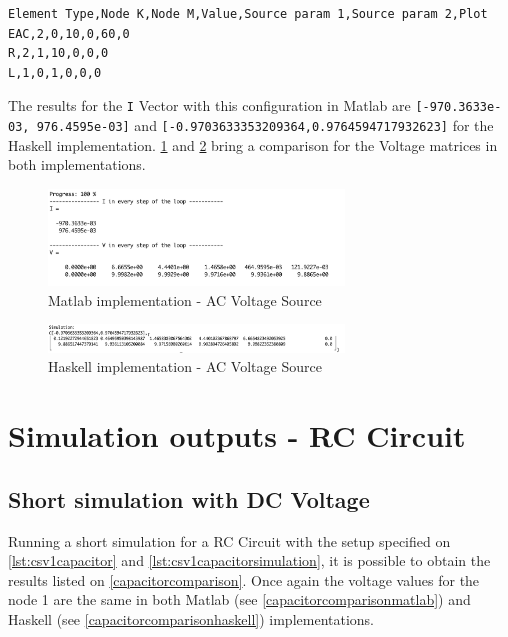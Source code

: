 \begin{lstlisting}[language=bash, label=getinfo, caption={Input data file for components in the Haskell implementation}, captionpos=b, label={lst:csv1reac}]
Element Type,Node K,Node M,Value,Source param 1,Source param 2,Plot
EAC,2,0,10,0,60,0
R,2,1,10,0,0,0
L,1,0,1,0,0,0
\end{lstlisting}

The results for the \lstinline!I! Vector with this configuration in Matlab are \lstinline![-970.3633e-03, 976.4595e-03]! and \lstinline![-0.9703633353209364,0.9764594717932623]! for the Haskell implementation. \ref{eacmatlab} and \ref{eachaskell} bring a comparison for the Voltage matrices in both implementations. 


\begin{figure}[H]
   \centering
   \includegraphics[width=0.7\textwidth]{img/eacmatlab.png}
   \caption{Matlab implementation - AC Voltage Source}
   \label{eacmatlab}
\end{figure}

\begin{figure}[H]
   \centering
   \includegraphics[width=0.7\textwidth]{img/eachaskell.png}
   \caption{Haskell implementation - AC Voltage Source}
   \label{eachaskell}
\end{figure}


\section{Simulation outputs - RC Circuit}

\subsection{Short simulation with DC Voltage}

Running a short simulation for a RC Circuit with the setup specified on \cref{lst:csv1capacitor} and \cref{lst:csv1capacitorsimulation}, it is possible to obtain the results listed on \cref{capacitorcomparison}. Once again the voltage values for the node 1 are the same in both Matlab (see \cref{capacitorcomparisonmatlab}) and Haskell (see \cref{capacitorcomparisonhaskell}) implementations. 


